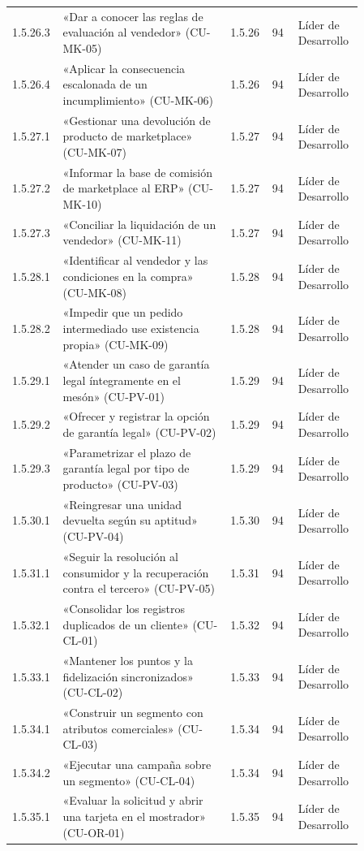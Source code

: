 \begin{longtable}{@{}p{0.075\linewidth}p{0.451\linewidth}p{0.075\linewidth}p{0.075\linewidth}p{0.179\linewidth}@{}}
1.5.26.3 & «Dar a conocer las reglas de evaluación al vendedor» (CU-MK-05) & 1.5.26 & 94 & Líder de Desarrollo \\
1.5.26.4 & «Aplicar la consecuencia escalonada de un incumplimiento» (CU-MK-06) & 1.5.26 & 94 & Líder de Desarrollo \\
1.5.27.1 & «Gestionar una devolución de producto de marketplace» (CU-MK-07) & 1.5.27 & 94 & Líder de Desarrollo \\
1.5.27.2 & «Informar la base de comisión de marketplace al ERP» (CU-MK-10) & 1.5.27 & 94 & Líder de Desarrollo \\
1.5.27.3 & «Conciliar la liquidación de un vendedor» (CU-MK-11) & 1.5.27 & 94 & Líder de Desarrollo \\
1.5.28.1 & «Identificar al vendedor y las condiciones en la compra» (CU-MK-08) & 1.5.28 & 94 & Líder de Desarrollo \\
1.5.28.2 & «Impedir que un pedido intermediado use existencia propia» (CU-MK-09) & 1.5.28 & 94 & Líder de Desarrollo \\
1.5.29.1 & «Atender un caso de garantía legal íntegramente en el mesón» (CU-PV-01) & 1.5.29 & 94 & Líder de Desarrollo \\
1.5.29.2 & «Ofrecer y registrar la opción de garantía legal» (CU-PV-02) & 1.5.29 & 94 & Líder de Desarrollo \\
1.5.29.3 & «Parametrizar el plazo de garantía legal por tipo de producto» (CU-PV-03) & 1.5.29 & 94 & Líder de Desarrollo \\
1.5.30.1 & «Reingresar una unidad devuelta según su aptitud» (CU-PV-04) & 1.5.30 & 94 & Líder de Desarrollo \\
1.5.31.1 & «Seguir la resolución al consumidor y la recuperación contra el tercero» (CU-PV-05) & 1.5.31 & 94 & Líder de Desarrollo \\
1.5.32.1 & «Consolidar los registros duplicados de un cliente» (CU-CL-01) & 1.5.32 & 94 & Líder de Desarrollo \\
1.5.33.1 & «Mantener los puntos y la fidelización sincronizados» (CU-CL-02) & 1.5.33 & 94 & Líder de Desarrollo \\
1.5.34.1 & «Construir un segmento con atributos comerciales» (CU-CL-03) & 1.5.34 & 94 & Líder de Desarrollo \\
1.5.34.2 & «Ejecutar una campaña sobre un segmento» (CU-CL-04) & 1.5.34 & 94 & Líder de Desarrollo \\
1.5.35.1 & «Evaluar la solicitud y abrir una tarjeta en el mostrador» (CU-OR-01) & 1.5.35 & 94 & Líder de Desarrollo \\

\end{longtable}
